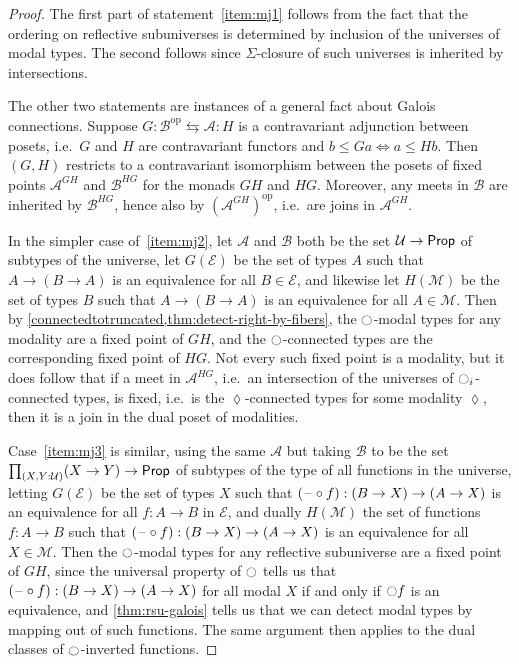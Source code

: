 \begin{proof}
  The first part of statement~\ref{item:mj1} follows from the fact that the ordering on reflective subuniverses is determined by inclusion of the universes of modal types.
  The second follows since $\Sigma$-closure of such universes is inherited by intersections.

  The other two statements are instances of a general fact about Galois connections.
  Suppose $G: \mathcal{B}^{\mathrm{op}} \leftrightarrows \mathcal{A} : H$ is a contravariant adjunction between posets, i.e.\ $G$ and $H$ are contravariant functors and $b \leq G a \Longleftrightarrow a \leq H b$.
  Then $(G,H)$ restricts to a contravariant isomorphism between the posets of fixed points $\mathcal{A}^{GH}$ and $\mathcal{B}^{HG}$ for the monads $G H$ and $H G$.
  Moreover, any meets in $\mathcal{B}$ are inherited by $\mathcal{B}^{HG}$, hence also by $(\mathcal{A}^{GH})^{\mathrm{op}}$, i.e.\ are joins in $\mathcal{A}^{GH}$.

  In the simpler case of~\ref{item:mj2}, let $\mathcal{A}$ and $\mathcal{B}$ both be the set $\mathcal{U} \to \mathsf{Prop}$ of subtypes of the universe, let $G(\mathcal{E})$ be the set of types $A$ such that $A \to (B\to A)$ is an equivalence for all $B\in \mathcal{E}$, and likewise let $H(\mathcal{M})$ be the set of types $B$ such that $A \to (B\to A)$ is an equivalence for all $A\in \mathcal{M}$.
  Then by \cref{connectedtotruncated,thm:detect-right-by-fibers}, the ${\ocircle}$-modal types for any modality are a fixed point of $GH$, and the ${\ocircle}$-connected types are the corresponding fixed point of $HG$.
  Not every such fixed point is a modality, but it does follow that if a meet in $\mathcal{A}^{HG}$, i.e.\ an intersection of the universes of ${\ocircle}_i$-connected types, is fixed, i.e.\ is the $\lozenge$-connected types for some modality $\lozenge$, then it is a join in the dual poset of modalities.

  Case~\ref{item:mj3} is similar, using the same $\mathcal{A}$ but taking $\mathcal{B}$ to be the set $\prd{X,Y:\UU} (X\to Y) \to \prop$ of subtypes of the type of all functions in the universe, letting $G(\mathcal{E})$ be the set of types $X$ such that $(\mathord{\hspace{1pt}\text{--}\hspace{1pt}}\circ f) : (B\to X) \to (A\to X)$ is an equivalence for all $f:A\to B$ in $\mathcal{E}$, and dually $H(\mathcal{M})$ the set of functions $f:A\to B$ such that $(\mathord{\hspace{1pt}\text{--}\hspace{1pt}}\circ f) : (B\to X) \to (A\to X)$ is an equivalence for all $X\in \mathcal{M}$.
  Then the ${\ocircle}$-modal types for any reflective subuniverse are a fixed point of $GH$, since the universal property of ${\ocircle}$ tells us that $(\mathord{\hspace{1pt}\text{--}\hspace{1pt}}\circ f) : (B\to X) \to (A\to X)$ for all modal $X$ if and only if ${\ocircle} f$ is an equivalence, and \cref{thm:rsu-galois} tells us that we can detect modal types by mapping out of such functions.
  The same argument then applies to the dual classes of ${\ocircle}$-inverted functions.
\end{proof}

